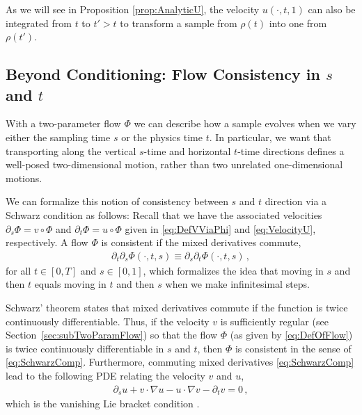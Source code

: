 \documentclass{article}
\theoremstyle{definition}
\theoremstyle{plain}
\theoremstyle{definition}
\theoremstyle{remark}
\newcommand{\Flow}{\Phi}
\begin{document}
As we will see in Proposition \ref{prop:AnalyticU}, the velocity $u(\cdot, t, 1)$ can also be integrated from $t$ to $t' > t $ to transform a sample from $\rho({t})$ into one from $\rho({t'})$. 












\subsection{Beyond Conditioning: Flow Consistency in $s$ and $t$}
With a two-parameter flow $\Flow$ we can describe how a sample evolves when we vary either the sampling time $s$ or the physics time $t$. In particular, we want that transporting along the vertical $s$-time and horizontal $t$-time directions defines a well-posed two-dimensional motion, rather than two unrelated one-dimensional motions. 




We can formalize this notion of consistency between $s$ and $t$ direction via a Schwarz condition as follows: Recall that we have the associated velocities $\partial_s \Phi = v \circ \Phi$ and $\partial_t \Phi = u \circ \Phi$ given in \eqref{eq:DefVViaPhi} and \eqref{eq:VelocityU}, respectively. A flow $\Phi$ is consistent if the mixed derivatives commute,
 \begin{align}\label{eq:SchwarzComp}
        \partial_t\partial_s  \Phi(\cdot, t, s) \equiv \partial_s\partial_t  \Flow(\cdot, t, s) \,,
    \end{align}
for all $t \in [0, T]$ and $s \in [0, 1]$, 
which formalizes the idea that moving in $s$ and then $t$ equals moving in $t$ and then $s$ when we make infinitesimal steps.

Schwarz' theorem states that mixed derivatives commute if the function is twice continuously differentiable. Thus, if the velocity $v$ is sufficiently regular (see Section~\ref{sec:subTwoParamFlow}) so that the flow $\Phi$ (as given by \eqref{eq:DefOfFlow}) is twice continuously differentiable in $s$ and $t$, then $\Phi$ is consistent in the sense of \eqref{eq:SchwarzComp}. 
Furthermore, commuting mixed derivatives \eqref{eq:SchwarzComp} lead to the following PDE relating the velocity $v$ and $u$,
\begin{align}\label{eq:SchwarzCompPDE}
        \partial_s u + v \cdot \nabla u - u \cdot \nabla v - \partial_t v = 0\,,
    \end{align}
which is the vanishing Lie bracket condition \citep[Section 4.2]{abraham_manifolds_1988}.
\end{document}
